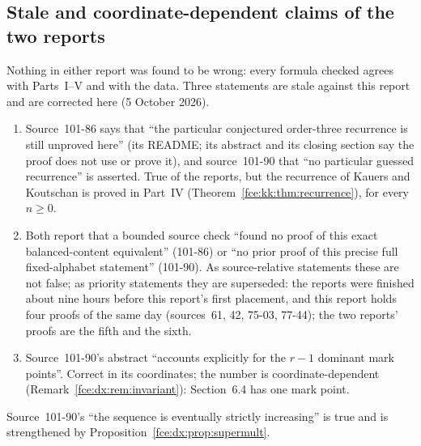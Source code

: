 \documentclass[11pt,a4paper]{article}
\numberwithin{equation}{section}
\theoremstyle{definition}\newtheorem{definition}[theorem]{Definition}
\theoremstyle{remark}\newtheorem{remark}[theorem]{Remark}
\begin{document}
\subsection{Stale and coordinate-dependent claims of the two reports}\label{fce:dx:sec:stale}
Nothing in either report was found to be wrong: every formula checked agrees
with Parts~I--V and with the data. Three statements are stale against this
report and are corrected here (5 October 2026).
\begin{enumerate}[label=(\alph*)]
\item Source~101-86 says that ``the particular conjectured order-three
recurrence is still unproved here'' (its README; its abstract and its
closing section say the proof does not use or prove it), and source~101-90 that ``no
particular guessed recurrence'' is asserted. True of the reports, but the
recurrence of Kauers and Koutschan is proved in Part~IV
(Theorem~\ref{fce:kk:thm:recurrence}), for every $n\ge0$.
\item Both report that a bounded source check ``found no proof of this exact
balanced-content equivalent'' (101-86) or ``no prior proof of this precise
full fixed-alphabet statement'' (101-90). As source-relative statements these
are not false; as priority statements they are superseded: the reports were
finished about nine hours before this report's first placement, and this
report holds four proofs of the same day (sources~61, 42, 75-03, 77-44); the
two reports' proofs are the fifth and the sixth.
\item Source~101-90's abstract ``accounts explicitly for the $r-1$ dominant
mark points''. Correct in its coordinates; the number is
coordinate-dependent (Remark~\ref{fce:dx:rem:invariant}): Section~6.4 has one
mark point.
\end{enumerate}
Source~101-90's ``the sequence is eventually strictly increasing'' is true and
is strengthened by Proposition~\ref{fce:dx:prop:supermult}.
\end{document}
